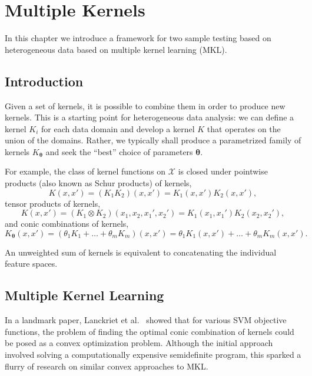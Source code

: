 \graphicspath{{./MKL/img/}}
\chapter{Multiple Kernels}
\label{C:MKL}
In this chapter we introduce a framework for two sample testing based
on heterogeneous data based on multiple kernel learning (MKL).

\section{Introduction}
Given a set of kernels, it is possible to combine them in order to produce new
kernels.  This is a starting point for heterogeneous data analysis: we
can define a kernel $K_i$ for each data domain and develop a kernel $K$ that operates
on the union of the domains.  Rather, we typically shall produce a parametrized
family of kernels $K_{{\boldsymbol \theta}}$ and seek the ``best'' choice of
parameters ${\boldsymbol \theta}$.

For example, the class of kernel functions on $\mathcal{X}$ is closed under pointwise products
(also known as Schur products) of kernels,
\begin{equation*}
  K(x,x') = (K_1K_2)(x,x')=K_1(x,x')K_2(x,x'),
\end{equation*}
tensor products of kernels,
\begin{equation*}
 K(x, x') = (K_1 \otimes  K_2)(x_1,x_2,x_1',x_2')=K_1(x_1,x_1')K_2(x_2,x_2'),
\end{equation*}
and conic combinations of kernels,
\begin{equation*}
  K_{{\boldsymbol \theta}}(x, x') = (\theta_1 K_1 + \ldots + \theta_m K_m)(x,x')=
  \theta_1 K_1(x,x') + \ldots + \theta_m K_m(x,x').
\end{equation*}

An unweighted sum of kernels is equivalent to concatenating the individual
feature spaces.

\section{Multiple Kernel Learning}
In a landmark paper, Lanckriet et al.\ \cite{lanckriet2004learning} showed
that for various SVM objective functions, the problem of finding the optimal
conic combination of kernels could be posed as a convex optimization problem.
Although the initial approach involved solving a computationally expensive
semidefinite program, this sparked a flurry of research on similar convex
approaches to MKL.

